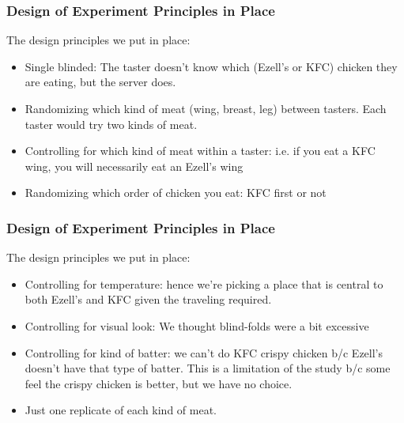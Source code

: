 \documentclass[handout]{beamer}
\newcommand{\blue}[1]{\textcolor{blue2}{#1}}
\begin{document}
\begin{frame}
\frametitle{Design of Experiment Principles in Place}

The design principles we put in place:

\vspace{0.25cm}

\begin{itemize}
\pause\item \blue{Single blinded}: The taster doesn't know which (Ezell's or KFC) chicken they are eating, but the server does.
\pause\item \blue{Randomizing} which kind of meat (wing, breast, leg) between tasters.  Each taster would try two kinds of meat.  
\pause\item \blue{Controlling for which kind of meat within a taster}:  i.e. if you eat a KFC wing, you will necessarily eat an Ezell's wing
\pause\item \blue{Randomizing} which order of chicken you eat:  KFC first or not
\end{itemize}
\end{frame}


\begin{frame}
\frametitle{Design of Experiment Principles in Place}

The design principles we put in place:

\vspace{0.25cm}

\begin{itemize}
\pause\item \blue{Controlling for temperature}: hence we're picking a place that is central to both Ezell's and KFC given the traveling required.
\pause\item \blue{Controlling for visual look}: We thought blind-folds were a bit excessive
\pause\item \blue{Controlling for kind of batter}:  we can't do KFC crispy chicken b/c Ezell's doesn't have that type of batter.  This is a limitation of the study b/c some feel the crispy chicken is better, but we have no choice.  
\pause\item Just one \blue{replicate} of each kind of meat.  
\end{itemize}
\end{frame}
\end{document}
